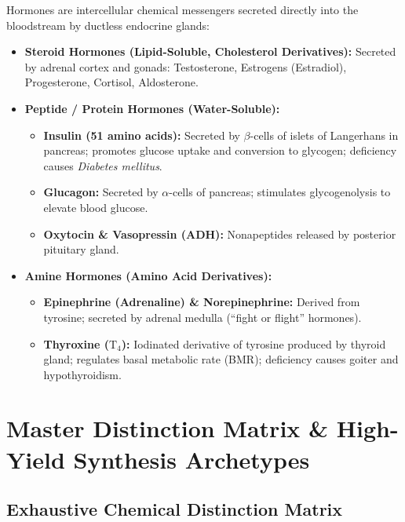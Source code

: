 \documentclass[10pt,twoside,openright]{book}
\begin{document}
\begin{conceptbox}
Hormones are intercellular chemical messengers secreted directly into the bloodstream by ductless endocrine glands:
\begin{itemize}
  \item \textbf{Steroid Hormones (Lipid-Soluble, Cholesterol Derivatives):}
  Secreted by adrenal cortex and gonads: Testosterone, Estrogens (Estradiol), Progesterone, Cortisol, Aldosterone.
  \item \textbf{Peptide / Protein Hormones (Water-Soluble):}
  \begin{itemize}
    \item \textbf{Insulin (51 amino acids):} Secreted by $\beta$-cells of islets of Langerhans in pancreas; promotes glucose uptake and conversion to glycogen; deficiency causes \textit{Diabetes mellitus}.
    \item \textbf{Glucagon:} Secreted by $\alpha$-cells of pancreas; stimulates glycogenolysis to elevate blood glucose.
    \item \textbf{Oxytocin \& Vasopressin (ADH):} Nonapeptides released by posterior pituitary gland.
  \end{itemize}
  \item \textbf{Amine Hormones (Amino Acid Derivatives):}
  \begin{itemize}
    \item \textbf{Epinephrine (Adrenaline) \& Norepinephrine:} Derived from tyrosine; secreted by adrenal medulla (``fight or flight'' hormones).
    \item \textbf{Thyroxine ($\mathrm{T_4}$):} Iodinated derivative of tyrosine produced by thyroid gland; regulates basal metabolic rate (BMR); deficiency causes goiter and hypothyroidism.
  \end{itemize}
\end{itemize}
\end{conceptbox}

\section{Master Distinction Matrix \& High-Yield Synthesis Archetypes}

\subsection{Exhaustive Chemical Distinction Matrix}
\end{document}
